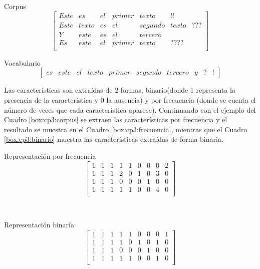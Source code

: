 \begin{mygraybox}[label={box:cp3:corpus}]{Corpus} 
\begin{equation*}
\begin{bmatrix}
Este&es&el&primer&texto&!!\\
Este&texto&es&el&segundo&texto&???\\
Y&este&es&el&tercero\\
Es&este&el&primer&texto&????\\
\end{bmatrix}
\end{equation*}
\end{mygraybox}

\begin{mygraybox}[label={box:cp3:caracteristicas}]{Vocabulario} 
\begin{equation*}
\begin{bmatrix}
es  & este & el & texto & primer & segundo & tercero & y & ? & !
\end{bmatrix}
\end{equation*}
\end{mygraybox}

Las características son extraídas de 2 formas, binario(donde 1 representa la presencia de la característica y 0 la ausencia) y por frecuencia (donde se cuenta el número de veces que cada característica aparece). Continuando con el ejemplo del Cuadro \ref{box:cp3:corpus} se extraen las características por frecuencia y el resultado se muestra en el Cuadro \ref{box:cp3:frecuencia}, mientras que el Cuadro \ref{box:cp3:binario} muestra las características extraídas de forma binaria.\\


\begin{mygraybox}[label={box:cp3:frecuencia}]{Representación por frecuencia} 
\begin{equation*}
\begin{bmatrix}
1 & 1 & 1 & 1 & 1 & 0 & 0 & 0 & 2\\
1 & 1 & 1 & 2 & 0 & 1 & 0 & 3 & 0\\
1 & 1 & 1 & 0 & 0 & 0 & 1 & 0 & 0\\
1 & 1 & 1 & 1 & 1 & 0 & 0 & 4 & 0\\
\end{bmatrix}
\end{equation*}
\end{mygraybox}

\ \\

\begin{mygraybox}[label={box:cp3:binario}]{Representación binaría} 
\begin{equation*}
\begin{bmatrix}
1 & 1 & 1 & 1 & 1 & 0 & 0 & 0 & 1\\
1 & 1 & 1 & 1 & 0 & 1 & 0 & 1 & 0\\
1 & 1 & 1 & 0 & 0 & 0 & 1 & 0 & 0\\
1 & 1 & 1 & 1 & 1 & 0 & 0 & 1 & 0\\
\end{bmatrix}
\end{equation*}
\end{mygraybox}




